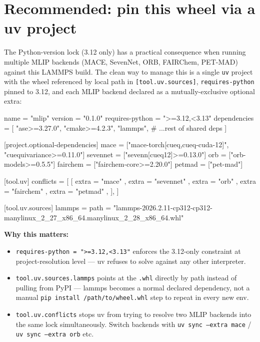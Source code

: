 \documentclass[11pt]{article}
\begin{document}
\section{Recommended: pin this wheel via a uv project}
\label{sec:uv-project}

The Python-version lock (3.12 only) has a practical consequence when running
multiple MLIP backends (MACE, SevenNet, ORB, FAIRChem, PET-MAD) against this
LAMMPS build.  The clean way to manage this is a single \texttt{uv} project
with the wheel referenced by local path in \texttt{[tool.uv.sources]},
\texttt{requires-python} pinned to 3.12, and each MLIP backend declared as a
mutually-exclusive optional extra:

\begin{codebox}[]
[project]
name = "mlip"
version = "0.1.0"
requires-python = ">=3.12,<3.13"
dependencies = [
  "ase>=3.27.0",
  "cmake>=4.2.3",
  "lammps",
  # ...rest of shared deps
]

[project.optional-dependencies]
mace     = ["mace-torch[cueq,cueq-cuda-12]", "cuequivariance>=0.11.0"]
sevennet = ["sevenn[cueq12]>=0.13.0"]
orb      = ["orb-models>=0.5.5"]
fairchem = ["fairchem-core>=2.20.0"]
petmad   = ["pet-mad"]

[tool.uv]
conflicts = [
  [
    { extra = "mace" },
    { extra = "sevennet" },
    { extra = "orb" },
    { extra = "fairchem" },
    { extra = "petmad" },
  ],
]

[tool.uv.sources]
lammps = { path = "lammps-2026.2.11-cp312-cp312-manylinux_2_27_x86_64.manylinux_2_28_x86_64.whl" }
\end{codebox}

\textbf{Why this matters:}
\begin{itemize}
  \item \texttt{requires-python = ">=3.12,<3.13"} enforces the 3.12-only
    constraint at project-resolution level --- uv refuses to solve against
    any other interpreter.
  \item \texttt{tool.uv.sources.lammps} points at the \texttt{.whl} directly
    by path instead of pulling from PyPI --- lammps becomes a normal declared
    dependency, not a manual \texttt{pip install /path/to/wheel.whl} step to
    repeat in every new env.
  \item \texttt{tool.uv.conflicts} stops uv from trying to resolve two MLIP
    backends into the same lock simultaneously.  Switch backends with
    \texttt{uv sync --extra mace} / \texttt{uv sync --extra orb} etc.

\end{itemize}
\end{document}
